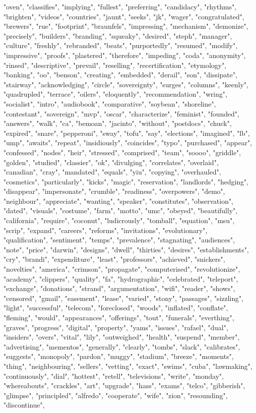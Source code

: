 "oven", "classifies", "implying", "fullest", "preferring", "candidacy", "rhythms", "brighten", "videos", "countries", "jaunt", "seeks", "jk", "wager", "congratulated", "brewers", "rue", "footprint", "braunfels", "impressing", "mechanism", "demonize", "precisely", "builders", "branding", "squeaky", "desired", "steph", "manager", "culture", "freshly", "rebranded", "beats", "purportedly", "resumed", "modify", "impressive", "proofs", "plastered", "therefore", "impeding", "coda", "anonymity", "rinsed", "descriptive", "prevail", "reselling", "recertification", "etymology", "banking", "oo", "benson", "creating", "embedded", "derail", "son", "dissipate", "stairway", "acknowledging", "circle", "sovereignty", "surges", "columns", "keenly", "quadrupled", "terrace", "oilers", "eloquently", "recommendation", "wring", "socialist", "intro", "audiobook", "comparative", "soybean", "shoreline", "contestant", "sovereign", "mvp", "oscar", "characterize", "feminist", "founded", "answers", "walk", "ca", "bemoan", "jacinto", "without", "postdocs", "chuck", "expired", "snare", "pepperoni", "sway", "tofu", "say", "elections", "imagined", "lb", "ump", "awaits", "repeat", "insidiously", "coincides", "typo", "purchased", "appear", "confessed", "nodes", "heir", "stressed", "comprised", "team", "soooo", "griddle", "golden", "studied", "classier", "ok", "divulging", "correlates", "overlaid", "canadian", "cray", "mandated", "equals", "yiu", "copying", "overhauled", "cosmetics", "particularly", "kicks", "magic", "reservation", "landlords", "hedging", "disappear", "impersonate", "crumble", "readiness", "overpowers", "demo", "neighbour", "appreciate", "wanting", "speaker", "constitutes", "observation", "dated", "visuals", "costume", "farm", "motto", "umc", "obeyed", "beautifully", "california", "require", "coconut", "ludicrously", "tomball", "equation", "msu", "scrip", "expand", "careers", "reforms", "invitations", "evolutionary", "qualification", "sentiment", "temps", "prevalence", "stagnating", "audiences", "note", "price", "darwin", "designs", "dwell", "thirties", "desires", "establishments", "cry", "brandi", "expenditure", "least", "professors", "achieved", "snickers", "novelties", "america", "crimson", "propagate", "computerised", "revolutionize", "academy", "clippers", "quality", "fa", "hydrographic", "celebrated", "teleport", "exchange", "donations", "strand", "argumentation", "wifi", "reader", "shows", "censored", "gmail", "easement", "lease", "varied", "stony", "passages", "sizzling", "light", "successful", "telecom", "foreclosed", "woods", "inflated", "conflate", "fleming", "would", "appearances", "offerings", "tout", "funerals", "everthing", "graves", "progress", "digital", "property", "yams", "issues", "rafael", "dual", "insiders", "overs", "vital", "lily", "outweighed", "health", "suspend", "member", "advertising", "mementos", "generally", "clearly", "tombs", "slack", "calibrates", "suggests", "monopoly", "pardon", "muggy", "stadium", "breeze", "moments", "thing", "neighbouring", "sellers", "vetting", "exact", "swims", "cuba", "lawmaking", "continuously", "dial", "hottest", "retell", "televisions", "write", "monday", "whereabouts", "crackles", "art", "upgrade", "hass", "exams", "telco", "gibberish", "glimpse", "principled", "alfredo", "cooperate", "wife", "zion", "resounding", "discontinue", 